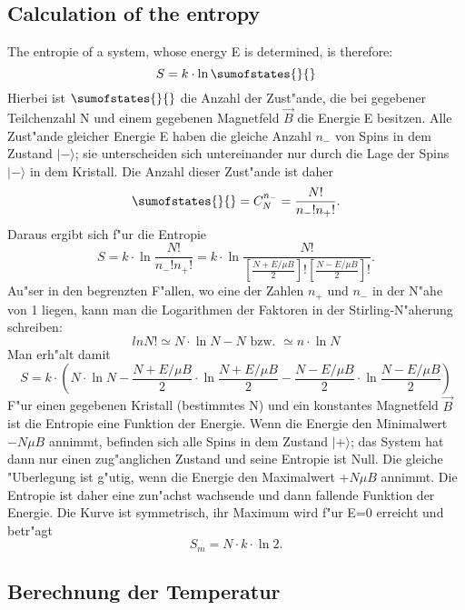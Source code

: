 \documentclass[12pt]{article}
\begin{document}
\begin{module}[id=mytemparature,uses=probability-intro]
\subsection{Calculation of the entropy}
The entropie of a system, whose energy E is determined, is therefore:
\begin{equation}
S=k \cdot \ln\sumofstates{}{}
\end{equation}
Hierbei ist $\sumofstates{}{}$ die Anzahl der Zust"ande, die bei gegebener Teilchenzahl 
N und einem gegebenen Magnetfeld $\vec{B}$ die Energie E besitzen. Alle 
Zust"ande gleicher Energie E haben die gleiche Anzahl $n_-$ von Spins in dem
Zustand $|-\rangle$; sie unterscheiden sich untereinander nur durch die
Lage der Spins $|-\rangle$  
in dem Kristall. Die Anzahl dieser Zust"ande ist daher
\begin{equation}
\sumofstates{}{}=C^{n_-}_N=\frac{N!}{n_-!n_+!}.
\end{equation}
Daraus ergibt sich f"ur die Entropie
\begin{equation}
S=k \cdot \ln\frac{N!}{n_-!n_+!}=k \cdot \ln\frac{N!}{[\frac{N+E/\mu B}{2}]![\frac{N-E/\mu B}
  {2}]!}.
\end{equation}
Au"ser in den begrenzten F"allen, wo eine der Zahlen $n_+$ und $n_-$ in der N"ahe 
von 1 liegen, kann man die Logarithmen der Faktoren in der Stirling-N"aherung 
schreiben:
\begin{equation}
lnN!\simeq N \cdot\ln N-N \mbox{ bzw. }\simeq n \cdot \ln N
\end{equation}
Man erh"alt damit
\begin{equation}
S=k \cdot (N \cdot \ln N-\frac{N+E/\mu B}{2} \cdot \ln\frac{N+E/\mu B}{2}-\frac{N-E/\mu B}{2}\cdot
  \ln\frac{N-E/\mu B}{2})
\end{equation}
F"ur einen gegebenen Kristall (bestimmtes N) und ein konstantes Magnetfeld 
$\vec{B}$ ist die Entropie eine Funktion der Energie.
Wenn die Energie den Minimalwert $-N\mu B$ annimmt, befinden sich alle Spins 
in dem Zustand $|+\rangle$; das System hat dann nur einen zug"anglichen Zustand und 
seine Entropie ist Null. Die gleiche "Uberlegung ist g"utig, wenn die Energie 
den Maximalwert $+N\mu B$ annimmt. Die Entropie ist daher eine zun"achst wachsende 
und dann fallende Funktion der Energie. Die Kurve ist symmetrisch, ihr Maximum 
wird f"ur E=0 erreicht und betr"agt 
\begin{equation}
S_m=N\cdot k\cdot\ln 2.
\end{equation}

\subsection{Berechnung der Temperatur}


\end{module}
\end{document}
